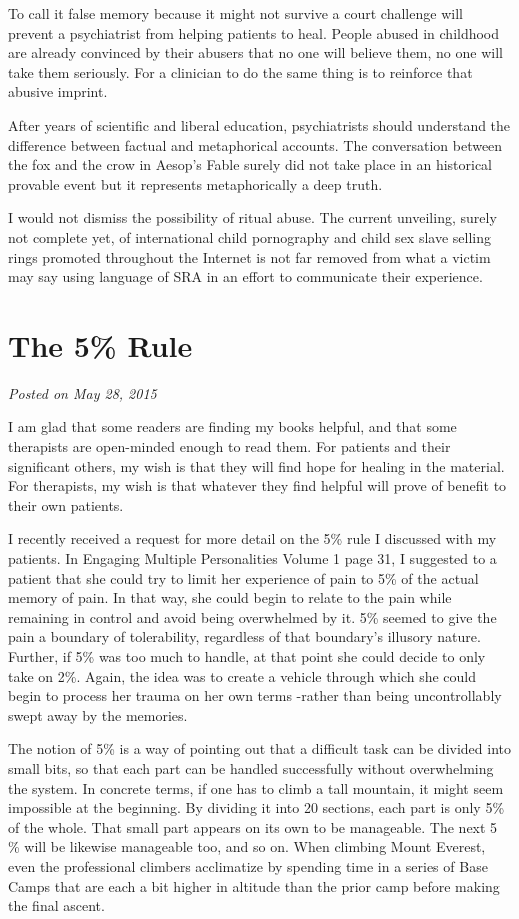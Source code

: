 \documentclass[]{book}
\begin{document}
To call it false memory because it might not survive a court challenge will prevent a psychiatrist from helping patients to heal. People abused in childhood are already convinced by their abusers that no one will believe them, no one will take them seriously. For a clinician to do the same thing is to reinforce that abusive imprint.

After years of scientific and liberal education, psychiatrists should understand the difference between factual and metaphorical accounts. The conversation between the fox and the crow in Aesop's Fable surely did not take place in an historical provable event but it represents metaphorically a deep truth.

I would not dismiss the possibility of ritual abuse. The current unveiling, surely not complete yet, of international child pornography and child sex slave selling rings promoted throughout the Internet is not far removed from what a victim may say using language of SRA in an effort to communicate their experience.

\hypertarget{the-5-rule}{%
\section{The 5\% Rule}\label{the-5-rule}}

\emph{Posted on May 28, 2015}

I am glad that some readers are finding my books helpful, and that some therapists are open-minded enough to read them. For patients and their significant others, my wish is that they will find hope for healing in the material. For therapists, my wish is that whatever they find helpful will prove of benefit to their own patients.

I recently received a request for more detail on the 5\% rule I discussed with my patients. In Engaging Multiple Personalities Volume 1 page 31, I suggested to a patient that she could try to limit her experience of pain to 5\% of the actual memory of pain. In that way, she could begin to relate to the pain while remaining in control and avoid being overwhelmed by it. 5\% seemed to give the pain a boundary of tolerability, regardless of that boundary's illusory nature. Further, if 5\% was too much to handle, at that point she could decide to only take on 2\%. Again, the idea was to create a vehicle through which she could begin to process her trauma on her own terms -rather than being uncontrollably swept away by the memories.

The notion of 5\% is a way of pointing out that a difficult task can be divided into small bits, so that each part can be handled successfully without overwhelming the system. In concrete terms, if one has to climb a tall mountain, it might seem impossible at the beginning. By dividing it into 20 sections, each part is only 5\% of the whole. That small part appears on its own to be manageable. The next 5 \% will be likewise manageable too, and so on. When climbing Mount Everest, even the professional climbers acclimatize by spending time in a series of Base Camps that are each a bit higher in altitude than the prior camp before making the final ascent.
\end{document}
